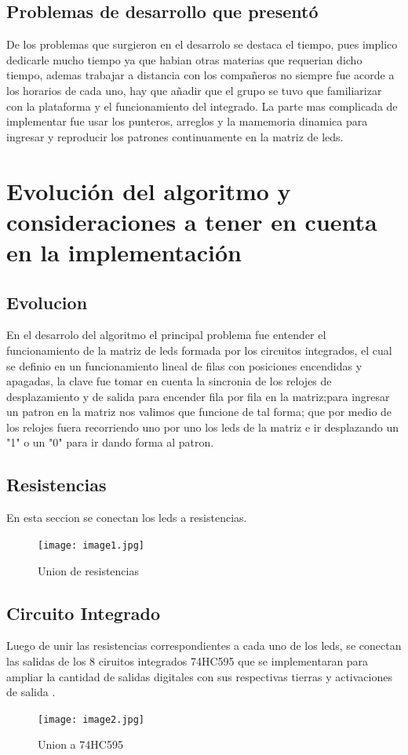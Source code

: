 \documentclass{article}
\begin{document}
\subsection{Problemas de desarrollo que presentó}
De los problemas que surgieron en el desarrolo se destaca el tiempo, pues implico dedicarle mucho tiempo ya que habian otras materias que requerian dicho tiempo, ademas trabajar a distancia con los compañeros no siempre fue acorde a los horarios de cada uno, hay que añadir que el grupo se tuvo que familiarizar con la plataforma y el funcionamiento del integrado.
La parte mas complicada de implementar fue usar los punteros, arreglos y la mamemoria dinamica para ingresar y reproducir los patrones continuamente en la matriz de leds.

\section{Evolución del algoritmo y consideraciones a tener en cuenta en la implementación} 
\label{contenido}
\subsection{Evolucion}
En el desarrolo del algoritmo el principal problema fue entender el funcionamiento de la matriz de leds formada por los circuitos integrados, el cual se definio en un funcionamiento lineal de filas con posiciones encendidas y apagadas, la clave fue tomar en cuenta la sincronia de los relojes de desplazamiento y de salida para encender fila por fila en la matriz;para ingresar un patron en la matriz nos valimos que funcione de tal forma; que por medio de los relojes fuera recorriendo uno por uno los leds de la matriz e ir desplazando un "1" o un "0" para ir dando forma al patron.

\subsection{Resistencias}
En esta seccion se conectan los leds a resistencias.
    \begin{figure}[h]
    \centering
    \texttt{[image: image1.jpg]}
    \caption{Union de resistencias}
    \label{fig:image1}
    \end{figure}

\subsection{Circuito Integrado}
Luego de unir las resistencias correspondientes a cada uno de los leds, se conectan las salidas de los 8 ciruitos integrados 74HC595 que se implementaran para ampliar la cantidad de salidas digitales con sus respectivas tierras y activaciones de salida .
    \begin{figure}[h]
    \texttt{[image: image2.jpg]}
    \centering
    \caption{Union a 74HC595}
    \label{fig:image2}
    \end{figure}
\end{document}
